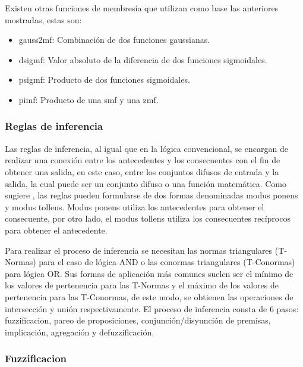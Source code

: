             Existen otras funciones de membresía que utilizan como base las anteriores mostradas, estas son:

            \begin{itemize}[leftmargin=\parindent]
                \item gauss2mf: Combinación de dos funciones gaussianas.
                \item dsigmf: Valor absoluto de la diferencia de dos funciones sigmoidales.
                \item psigmf: Producto de dos funciones sigmoidales.
                \item pimf: Producto de una smf y una zmf.
            \end{itemize}

        
        \subsubsection{Reglas de inferencia}
            
            Las reglas de inferencia, al igual que en la lógica convencional, se encargan de realizar una conexión entre los antecedentes y los consecuentes con el fin de obtener una salida, en este caso, entre los conjuntos difusos de entrada y la salida, la cual puede ser un conjunto difuso o una función matemática. Como sugiere \textcite{cruz2010inteligencia}, las reglas pueden formularse de dos formas denominadas modus ponens y modus tollens. Modus ponens utiliza los antecedentes para obtener el consecuente, por otro lado, el modus tollens utiliza los consecuentes recíprocos para obtener el antecedente.
                        
            Para realizar el proceso de inferencia se necesitan las normas triangulares (T-Normas) para el caso de lógica AND o las conormas triangulares (T-Conormas) para lógica OR. Sus formas de aplicación más comunes suelen ser el mínimo de los valores de pertenencia para las T-Normas y el máximo de los valores de pertenencia para las T-Conormas, de este modo, se obtienen las operaciones de intersección y unión respectivamente. El proceso de inferencia consta de 6 pasos: fuzzificacion, pareo de proposiciones, conjunción/disyunción de premisas, implicación, agregación y defuzzificación.

        \subsubsection{Fuzzificacion}
            
